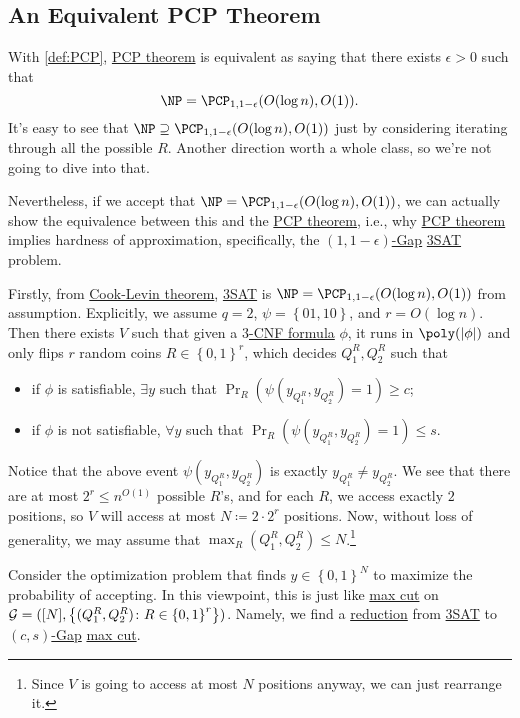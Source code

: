 \subsection{An Equivalent PCP Theorem}
With \autoref{def:PCP}, \hyperref[thm:PCP]{PCP theorem} is equivalent as saying that there exists \(\epsilon > 0\) such that
\[
	\NP = \PCP_{1, 1-\epsilon }(O(\log n), O(1)).
\]
It's easy to see that \(\NP \supseteq \PCP_{1, 1-\epsilon }(O(\log n), O(1))\) just by considering iterating through all the possible \(R\). Another direction worth a whole class, so we're not going to dive into that.

Nevertheless, if we accept that \(\NP = \PCP_{1, 1-\epsilon }(O(\log n), O(1))\), we can actually show the equivalence between this and the \hyperref[thm:PCP]{PCP theorem}, i.e., why \hyperref[thm:PCP]{PCP theorem} implies hardness of approximation, specifically, the \hyperref[def:c-s-Gap]{\((1, 1-\epsilon )\)-Gap} \hyperref[prb:max-3SAT]{3SAT} problem.

Firstly, from \hyperref[thm:Cook-Levin]{Cook-Levin theorem}, \hyperref[prb:max-3SAT]{3SAT} is \(\NP=\PCP_{1, 1-\epsilon }(O(\log n), O(1))\) from assumption. Explicitly, we assume \(q = 2\), \(\psi = \left\{ 01, 10 \right\} \), and \(r = O(\log n)\). Then there exists \(V\) such that given a \hyperref[def:k-CNF]{\(3\)-CNF formula} \(\phi \), it runs in \(\poly(\vert \phi  \vert )\) and only flips \(r\) random coins \(R\in \left\{ 0, 1 \right\} ^r\), which decides \(Q_1^R, Q_2^R\) such that
\begin{itemize}
	\item if \(\phi \) is satisfiable, \(\exists y\) such that \(\Pr_{R}(\psi (y_{Q_1^R}, y_{Q_2^R}) = 1) \geq c\);
	\item if \(\phi \) is not satisfiable, \(\forall y\) such that \(\Pr_{R}(\psi (y_{Q_1^R}, y_{Q_2^R}) = 1) \leq s\).
\end{itemize}
Notice that the above event \(\psi (y_{Q_1^R}, y_{Q_2^R})\) is exactly \(y_{Q_1^R} \neq y_{Q_2^R}\). We see that there are at most \(2^r \leq n^{O(1)}\) possible \(R\)'s, and for each \(R\), we access exactly \(2\) positions, so \(V\) will access at most \(N\coloneqq 2\cdot 2^r\) positions. Now, without loss of generality, we may assume that \(\max _R (Q_1^R, Q_2^R) \leq N\).\footnote{Since \(V\) is going to access at most \(N\) positions anyway, we can just rearrange it.}

Consider the optimization problem that finds \(y\in \left\{ 0, 1 \right\} ^N\) to maximize the probability of accepting. In this viewpoint, this is just like \hyperref[prb:max-cut]{max cut} on \(\mathcal{\MakeUppercase{g}} =([N], \left\{ (Q_1^R, Q_2^R)\colon R\in \left\{ 0, 1 \right\} ^r \right\} )\). Namely, we find a \hyperref[def:reduction]{reduction} from \hyperref[prb:max-3SAT]{3SAT} to \hyperref[def:c-s-Gap]{\((c, s)\)-Gap} \hyperref[prb:max-cut]{max cut}.


